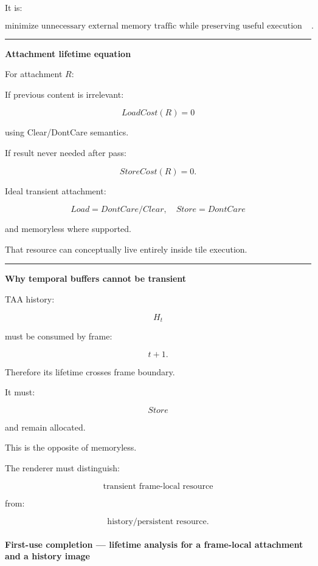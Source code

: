 It is:

\[
\boxed{
\text{minimize unnecessary external memory traffic while preserving useful execution structure}.
}
\]

\begin{center}\rule{0.5\linewidth}{0.5pt}\end{center}

\textbf{Attachment lifetime equation}

For attachment \(R\):

If previous content is irrelevant:

\[
LoadCost(R)=0
\]

using Clear/DontCare semantics.

If result never needed after pass:

\[
StoreCost(R)=0.
\]

Ideal transient attachment:

\[
\boxed{
Load=DontCare/Clear
,\quad
Store=DontCare
}
\]

and memoryless where supported.

That resource can conceptually live entirely inside tile execution.

\begin{center}\rule{0.5\linewidth}{0.5pt}\end{center}

\textbf{Why temporal buffers cannot be transient}

TAA history:

\[
H_t
\]

must be consumed by frame:

\[
t+1.
\]

Therefore its lifetime crosses frame boundary.

It must:

\[
Store
\]

and remain allocated.

This is the opposite of memoryless.

The renderer must distinguish:

\[
\boxed{
\text{transient frame-local resource}
}
\]

from:

\[
\boxed{
\text{history/persistent resource}.
}
\]

\paragraph{First-use completion --- lifetime analysis for a frame-local attachment and a history image}\label{first-use-completion-lifetime-analysis-for-a-frame-local-attachment-and-a-history-image}

